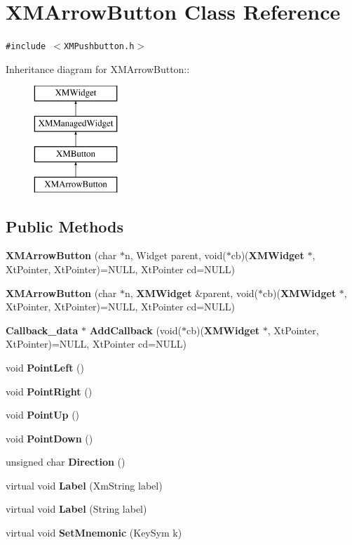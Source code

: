 \section{XMArrow\-Button  Class Reference}
\label{classXMArrowButton}
{\tt \#include $<$XMPushbutton.h$>$}

Inheritance diagram for XMArrow\-Button::\begin{figure}[H]
\begin{center}
\leavevmode
\includegraphics[height=4cm]{classXMArrowButton}
\end{center}
\end{figure}
\subsection*{Public Methods}
\begin{CompactItemize}
\item 
{\bf XMArrow\-Button} (char $\ast$n, Widget parent, void($\ast$cb)({\bf XMWidget} $\ast$, Xt\-Pointer, Xt\-Pointer)=NULL, Xt\-Pointer cd=NULL)
\item 
{\bf XMArrow\-Button} (char $\ast$n, {\bf XMWidget} \&parent, void($\ast$cb)({\bf XMWidget} $\ast$, Xt\-Pointer, Xt\-Pointer)=NULL, Xt\-Pointer cd=NULL)
\item 
{\bf Callback\_\-data} $\ast$ {\bf Add\-Callback} (void($\ast$cb)({\bf XMWidget} $\ast$, Xt\-Pointer, Xt\-Pointer)=NULL, Xt\-Pointer cd=NULL)
\item 
void {\bf Point\-Left} ()
\item 
void {\bf Point\-Right} ()
\item 
void {\bf Point\-Up} ()
\item 
void {\bf Point\-Down} ()
\item 
unsigned char {\bf Direction} ()
\item 
virtual void {\bf Label} (Xm\-String label)
\item 
virtual void {\bf Label} (String label)
\item 
virtual void {\bf Set\-Mnemonic} (Key\-Sym k)
\end{CompactItemize}


